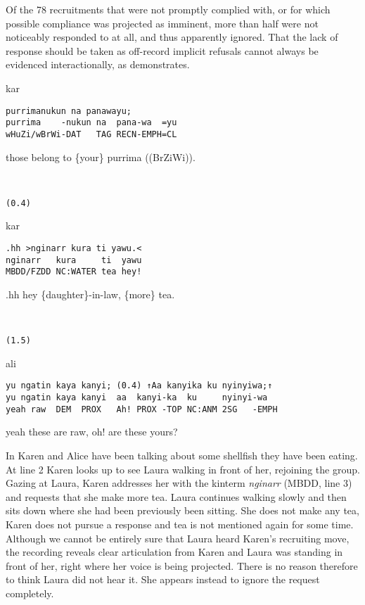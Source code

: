 \documentclass[output=paper,nonflat,colorlinks,citecolor=brown]{langsci/langscibook}
\begin{document}
Of the 78 recruitments that were not promptly complied with, or for which possible compliance was projected as imminent, more than half were not noticeably responded to at all, and thus apparently ignored. That the lack of response should be taken as off-record implicit refusals cannot always be evidenced interactionally, as  demonstrates.

\vspace{2mm}
%
\begin{transbox}{1}{kar}
\begin{verbatim}
purrimanukun na panawayu;
purrima    -nukun na  pana-wa  =yu
wHuZi/wBrWi-DAT   TAG RECN-EMPH=CL
\end{verbatim}
those belong to \{your\} purrima ((BrZiWi)).
\end{transbox}
%
\begin{transbox}{2}{~}
\begin{verbatim}
(0.4)
\end{verbatim}
\end{transbox}
%
\begin{mdframednoverticalspace}[style=firstfoc]
\begin{transbox}{3}{kar}
\begin{verbatim}
.hh >nginarr kura ti yawu.<
nginarr   kura     ti  yawu
MBDD/FZDD NC:WATER tea hey!
\end{verbatim}
.hh hey \{daughter\}-in-law, \{more\} tea.
\end{transbox}
\end{mdframednoverticalspace}
%
\begin{transbox}{4}{~}
\begin{verbatim}
(1.5)
\end{verbatim}
\end{transbox}\vspace{-2mm}
%
\begin{transbox}{5}{ali}
\begin{verbatim}
yu ngatin kaya kanyi; (0.4) ↑Aa kanyika ku nyinyiwa;↑
yu ngatin kaya kanyi  aa  kanyi-ka  ku     nyinyi-wa
yeah raw  DEM  PROX   Ah! PROX -TOP NC:ANM 2SG   -EMPH
\end{verbatim}
yeah these are raw, oh! are these yours?
\end{transbox}\bigskip

In  Karen and Alice have been talking about some shellfish they have been eating. At line 2 Karen looks up to see Laura walking in front of her, rejoining the group. Gazing at Laura, Karen addresses her with the kinterm \textit{nginarr} (MBDD, line 3) and requests that she make more tea. Laura continues walking slowly and then sits down where she had been previously been sitting. She does not make any tea, Karen does not pursue a response and tea is not mentioned again for some time. Although we cannot be entirely sure that Laura heard Karen’s recruiting move, the recording reveals clear articulation from Karen and Laura was standing in front of her, right where her voice is being projected. There is no reason therefore to think Laura did not hear it. She appears instead to ignore the request completely.
\end{document}
